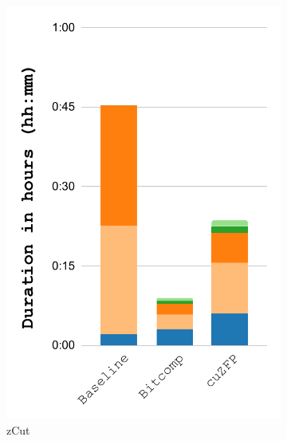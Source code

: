 \documentclass[Ingles]{ic-tese-v3}
\begin{document}
\begin{figure}[h!]
\begin{subfigure}{0.3\textwidth}
    \end{subfigure}%
    \begin{subfigure}{0.3\textwidth}
        \includegraphics[width=\textwidth,trim={0 0 0 0},clip]{figures/compress_breakdown/breakdown_compress_salt_zcut.pdf}
        \caption{zCut}
        \label{fig:compress_breakdown_zcut}
    \end{subfigure}%
    \begin{subfigure}{0.3\textwidth}

\end{subfigure}
\end{figure}
\end{document}
